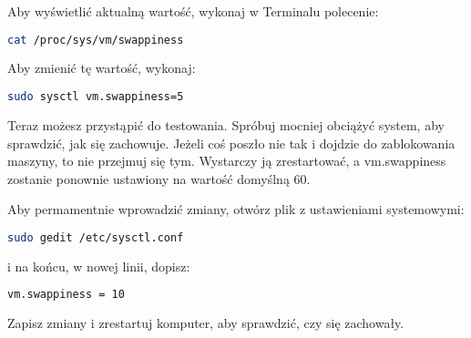 Aby wyświetlić aktualną wartość, wykonaj w Terminalu polecenie:

\begin{lstlisting}[language=bash]
cat /proc/sys/vm/swappiness
\end{lstlisting}

Aby zmienić tę wartość, wykonaj:

\begin{lstlisting}[language=bash]
sudo sysctl vm.swappiness=5
\end{lstlisting}

Teraz możesz przystąpić do testowania. Spróbuj mocniej obciążyć system, aby sprawdzić, jak się zachowuje. Jeżeli coś poszło nie tak i dojdzie do zablokowania maszyny, to nie przejmuj się tym. Wystarczy ją zrestartować, a vm.swappiness zostanie ponownie ustawiony na wartość domyślną 60.

\noindent Aby permamentnie wprowadzić zmiany, otwórz plik z ustawieniami systemowymi:

\begin{lstlisting}[language=bash]
sudo gedit /etc/sysctl.conf
\end{lstlisting}

\noindent i na końcu, w nowej linii, dopisz:

\begin{lstlisting}[language=bash]
vm.swappiness = 10
\end{lstlisting}

\noindent Zapisz zmiany i zrestartuj komputer, aby sprawdzić, czy się zachowały.
